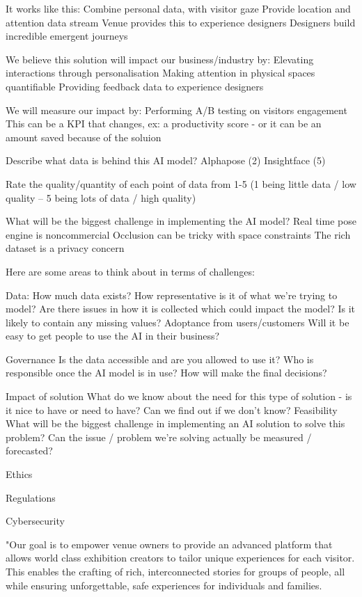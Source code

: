 It works like this:
Combine personal data, with visitor gaze
Provide location and attention data stream
Venue provides this to experience designers 
Designers build incredible emergent journeys 

We believe this solution will impact our business/industry by:
Elevating interactions through personalisation
Making attention in physical spaces quantifiable
Providing feedback data to experience designers

We will measure our impact by: Performing A/B testing on visitors engagement
This can be a KPI that changes, ex: a productivity score  - or it can be an amount saved because of the soluion

Describe what data is behind this AI model? 
Alphapose (2)
Insightface (5)

Rate the quality/quantity of each point of data from 1-5 (1 being little data / low quality – 5 being lots of data / high quality)

What will be the biggest challenge in implementing the AI model?
Real time pose engine is noncommercial 
Occlusion can be tricky with space constraints
The rich dataset is a privacy concern

Here are some areas to think about in terms of challenges:

Data: How much data exists? How representative is it of what we're trying to model? Are there issues in how it is collected which could impact the model? Is it likely to contain any missing values? 
Adoptance from users/customers
Will it be easy to get people to use the AI in their business?

Governance
Is the data accessible and are you allowed to use it?  Who is responsible once the AI model is in use? How will make the final decisions?

Impact of solution
What do we know about the need for this type of solution - is it nice to have or need to have? Can we find out if we don’t know? Feasibility
What will be the biggest challenge in implementing an AI solution to solve this problem? Can the issue / problem we're solving actually be measured / forecasted?

Ethics

Regulations

Cybersecurity



"Our goal is to empower venue owners to provide an advanced platform that allows world class exhibition creators to tailor unique experiences for each visitor. This enables the crafting of rich, interconnected stories for groups of people, all while ensuring unforgettable, safe experiences for individuals and families.


